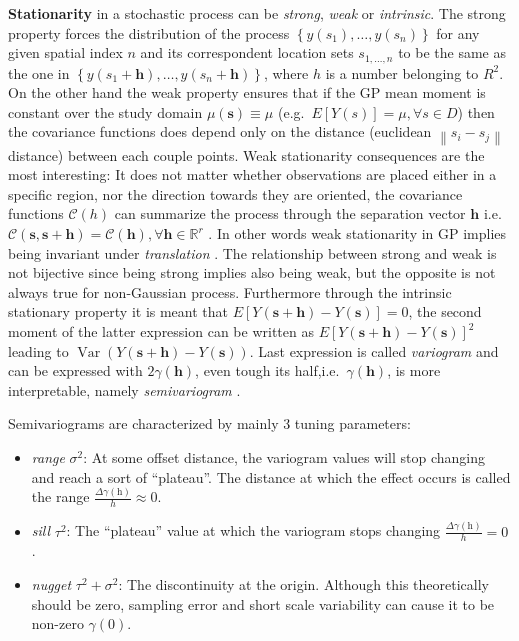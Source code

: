 \documentclass[
  12pt,
  a4paper,
  oneside]{book}
\providecommand{\tightlist}{%
  \setlength{\itemsep}{0pt}\setlength{\parskip}{0pt}}
\theoremstyle{definition}
\theoremstyle{definition}
\theoremstyle{definition}
\theoremstyle{remark}
\begin{document}
\textbf{Stationarity} in a stochastic process can be \emph{strong}, \emph{weak} or \emph{intrinsic}. The strong property forces the distribution of the process \(\left\{y\left(s_{1}\right), \ldots, y\left(s_{n}\right)\right\}\) for any given spatial index \(n\) and its correspondent location sets \(s_{1,\ldots,n}\) to be the same as the one in \(\left\{y\left(s_{1}+\boldsymbol{h}\right), \ldots, y\left(s_{n}+\boldsymbol{h}\right)\right\}\), where \(h\) is a number belonging to \(R^{2}\).
On the other hand the weak property ensures that if the GP mean moment is constant over the study domain \(\mu(\mathbf{s}) \equiv \mu\) (e.g.~\(E[Y(s)]=\mu, \forall s \in D\)) then the covariance functions does depend only on the distance (euclidean \(\left\|s_{i}-s_{j}\right\|\) distance) between each couple points.
Weak stationarity consequences are the most interesting: It does not matter whether observations are placed either in a specific region, nor the direction towards they are oriented, the covariance functions \(\mathcal{C}(h)\) can summarize the process through the separation vector \(\mathbf{h}\) i.e.~\(\mathcal{C}(\mathbf{s}, \mathbf{s}+\mathbf{h})=\mathcal{C}(\mathbf{h}), \forall \mathbf{h} \in \mathbb{R}^{r}\) \citep{Banerjee-Gelfand}. In other words weak stationarity in GP implies being invariant under \emph{translation} \citeyearpar{Krainski-Rubio}. The relationship between strong and weak is not bijective since being strong implies also being weak, but the opposite is not always true for non-Gaussian process.
Furthermore through the intrinsic stationary property it is meant that \(E[Y(\mathbf{s}+\mathbf{h})-Y(\mathbf{s})]=0\), the second moment of the latter expression can be written as \(E[Y(\mathbf{s}+\mathbf{h})-Y(\mathbf{s})]^{2}\) leading to \(\operatorname{Var}(Y(\mathbf{s}+\mathbf{h})-Y(\mathbf{s}))\). Last expression is called \emph{variogram} and can be expressed with \(2 \gamma(\mathbf{h})\), even tough its half,i.e.~\(\gamma(\mathbf{h})\), is more interpretable, namely \emph{semivariogram} \citep{Cressie_2015}.

Semivariograms are characterized by mainly 3 tuning parameters:

\begin{itemize}
\tightlist
\item
  \emph{range} \(\sigma^{2}\): At some offset distance, the variogram values will stop changing and reach a sort of ``plateau''. The distance at which the effect occurs is called the range \(\frac{\Delta\gamma(\mathrm{h})}{h} \approx 0\).
\item
  \emph{sill} \(\tau^{2}\): The ``plateau'' value at which the variogram stops changing \(\frac{\Delta\gamma(\mathrm{h})}{h} = 0\).
\item
  \emph{nugget} \(\tau^{2}+\sigma^{2}\): The discontinuity at the origin. Although this theoretically should be zero, sampling error and short scale variability can cause it to be non-zero \(\gamma(\mathrm{0})\).
\end{itemize}
\end{document}
